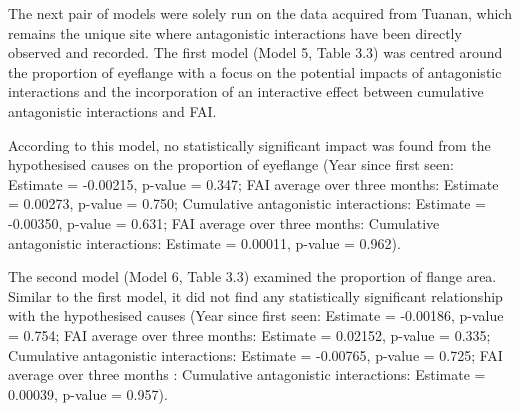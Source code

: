 The next pair of models were solely run on the data acquired from Tuanan, which remains the unique site where antagonistic interactions have been directly observed and recorded. The first model (Model 5, Table 3.3) was centred around the proportion of eyeflange with a focus on the potential impacts of antagonistic interactions and the incorporation of an interactive effect between cumulative antagonistic interactions and FAI.

According to this model, no statistically significant impact was found from the hypothesised causes on the proportion of eyeflange (Year since first seen: Estimate = -0.00215, p-value = 0.347; FAI average over three months: Estimate = 0.00273, p-value = 0.750; Cumulative antagonistic interactions: Estimate = -0.00350, p-value = 0.631; FAI average over three months: Cumulative antagonistic interactions: Estimate = 0.00011, p-value = 0.962).

The second model (Model 6, Table 3.3) examined the proportion of flange area. Similar to the first model, it did not find any statistically significant relationship with the hypothesised causes (Year since first seen: Estimate = -0.00186, p-value = 0.754; FAI average over three months: Estimate = 0.02152, p-value = 0.335; Cumulative antagonistic interactions: Estimate = -0.00765, p-value = 0.725; FAI average over three months : Cumulative antagonistic interactions: Estimate = 0.00039, p-value = 0.957).

